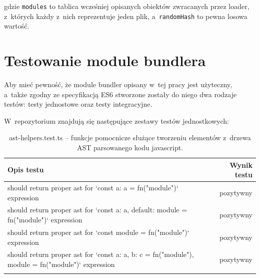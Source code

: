 \documentclass{SGGW-thesis}
\begin{document}
gdzie \verb|modules| to tablica wcześniej opisanych obiektów zwracanych przez loader, z~których każdy z~nich reprezentuje jeden plik, a~\verb|randomHash| to pewna losowa wartość.


\section{Testowanie module bundlera}
Aby mieć pewność, że module bundler opisany w~tej pracy jest użyteczny, a~także zgodny ze specyfikacją ES6 stworzone zostały do niego dwa rodzaje testów: testy jednostowe oraz testy integracyjne.

W~repozytorium znajdują się następujące zestawy testów jednostkowych:
\setlength\LTleft{0pt}
\setlength\LTright{0pt}
\begin{longtable}{@{\extracolsep{\fill}}|p{}|r|@{} }
    \hline
    \textbf{Opis testu}                                                                                                                                              & \textbf{Wynik testu} \\ \hline
    \endfirsthead
    \endhead
    should return proper ast for `const {a: a} = fn("module")` expression                                   & pozytywny            \\ \hline
    should return proper ast for `const {a: a, default: module} = fn("module")` expression                  & pozytywny            \\ \hline
    should return proper ast for `const module = fn("module")` expression                                   & pozytywny            \\ \hline
    should return proper ast for `const {a: a, b: c} = fn("module"), module = fn("module")` expression      & pozytywny            \\ \hline
    \caption{ast-helpers.test.ts -- funkcje pomocnicze służące tworzeniu elementów z~drzewa AST parsowanego kodu javascript.}
\end{longtable}
\end{document}
